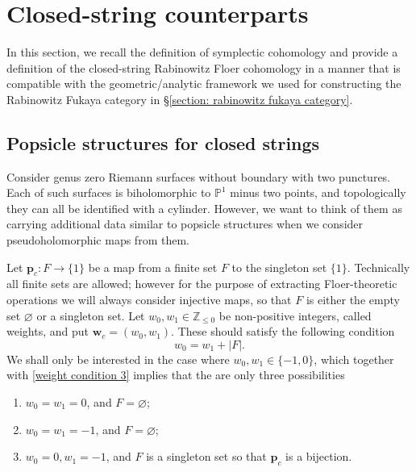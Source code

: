\documentclass[11pt]{amsproc}
\def\Z{{\mathbb Z}}
\def\P{{\mathbb P}}
\theoremstyle{remark}
\numberwithin{equation}{section}
\begin{document}
\section{Closed-string counterparts}\label{section: closed-string rfc}

In this section, we recall the definition of symplectic cohomology and provide a definition of the closed-string Rabinowitz Floer cohomology in a manner that is compatible with the geometric/analytic framework we used for constructing the Rabinowitz Fukaya category in \S\ref{section: rabinowitz fukaya category}.

\subsection{Popsicle structures for closed strings}\label{section: closed string popsicle}

Consider genus zero Riemann surfaces without boundary with two punctures.
Each of such surfaces is biholomorphic to $\P^{1}$ minus two points,
and topologically they can all be identified with a cylinder.
However, we want to think of them as carrying additional data similar to popsicle structures when we consider pseudoholomorphic maps from them.

Let $\mathbf{p}_{c}: F \to \{1\}$ be a map from a finite set $F$ to the singleton set $\{1\}$.
Technically all finite sets are allowed;
however for the purpose of extracting Floer-theoretic operations we will always consider injective maps, 
so that $F$ is either the empty set $\varnothing$ or a singleton set.
Let $w_{0}, w_{1} \in \Z_{\le 0}$ be non-positive integers, called weights, and put $\mathbf{w}_{c} = (w_{0}, w_{1})$.
These should satisfy the following condition
\begin{equation}\label{weight condition 3}
w_{0} = w_{1} + |F|.
\end{equation}
We shall only be interested in the case where $w_{0}, w_{1} \in \{-1, 0\}$,
which together with \eqref{weight condition 3} implies that the are only three possibilities
\begin{enumerate}[label=(\roman*)]

\item $w_{0} = w_{1} = 0$, and $F = \varnothing$;

\item $w_{0} = w_{1} = -1$, and $F = \varnothing$;

\item $w_{0} = 0, w_{1} = -1$, and $F$ is a singleton set so that $\mathbf{p}_{c}$ is a bijection.

\end{enumerate}
\end{document}
